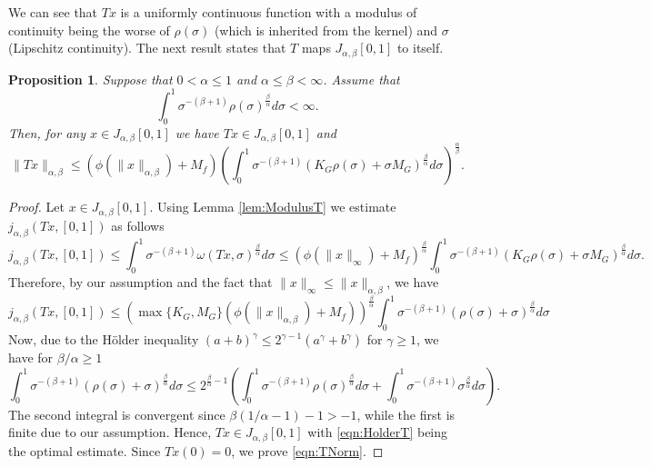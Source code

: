 \documentclass[12pt,a4paper]{article}
\newtheorem{prop}{Proposition}
\begin{document}
We can see that $Tx$ is a uniformly continuous function with a modulus of continuity being the worse of $\rho(\sigma)$ (which is inherited from the kernel) and $\sigma$ (Lipschitz continuity). The next result states that $T$ maps $J_{\alpha,\beta}[0,1]$ to itself.
\begin{prop}\label{prop:TNorm}
	Suppose that $0<\alpha\leq 1$ and $\alpha \leq \beta < \infty$. Assume that
	\begin{equation}\label{eqn:AssumRho}
		\int_0^1 \sigma^{-(\beta+1)} \rho(\sigma)^\frac{\beta}{\alpha} d\sigma < \infty.
	\end{equation}
	Then, for any $x \in J_{\alpha,\beta}[0,1]$ we have $Tx \in J_{\alpha,\beta}[0,1]$ and
	\begin{equation}\label{eqn:TNorm}
		\|Tx\|_{\alpha,\beta} \leq \left(\phi(\|x\|_{\alpha,\beta}) + M_f\right)  \left(\int_0^1 \sigma^{-(\beta+1)} \left(K_G\rho(\sigma) + \sigma M_G \right)^\frac{\beta}{\alpha} d\sigma\right)^\frac{\alpha}{\beta}.
	\end{equation}
\end{prop}
\begin{proof}
	Let $x\in J_{\alpha,\beta}[0,1]$. Using Lemma \ref{lem:ModulusT} we estimate $j_{\alpha,\beta}(Tx, [0,1])$ as follows
	\begin{equation}\label{eqn:HolderT}
		j_{\alpha,\beta}(Tx, [0,1]) \leq \int_0^1 \sigma^{-(\beta+1)} \omega(Tx, \sigma)^\frac{\beta}{\alpha} d\sigma \leq \left(\phi(\|x\|_\infty) + M_f\right)^\frac{\beta}{\alpha} \int_0^1 \sigma^{-(\beta+1)} \left(K_G\rho(\sigma) + \sigma M_G\right)^\frac{\beta}{\alpha} d\sigma. 
	\end{equation}
	Therefore, by our assumption and the fact that $\|x\|_\infty \leq \|x\|_{\alpha,\beta}$, we have
	\begin{equation}
		j_{\alpha,\beta}(Tx, [0,1]) \leq \left(\max\{K_G, M_G\}\left(\phi(\|x\|_{\alpha,\beta}) + M_f\right)\right)^\frac{\beta}{\alpha} \int_0^1 \sigma^{-(\beta+1)} \left(\rho(\sigma) + \sigma\right)^\frac{\beta}{\alpha} d\sigma
	\end{equation}
	Now, due to the H\"older inequality $(a+b)^\gamma \leq 2^{\gamma-1} (a^\gamma + b^\gamma)$ for $\gamma \geq 1$, we have for $\beta/\alpha \geq 1$
	\begin{equation}
		\int_0^1 \sigma^{-(\beta+1)} \left(\rho(\sigma) + \sigma \right)^\frac{\beta}{\alpha} d\sigma \leq 2^{\frac{\beta}{\alpha}-1}\left(\int_0^1 \sigma^{-(\beta+1)} \rho(\sigma)^\frac{\beta}{\alpha} d\sigma + \int_0^1 \sigma^{-(\beta+1)} \sigma^\frac{\beta}{\alpha} d\sigma\right).
	\end{equation}
	The second integral is convergent since $\beta(1/\alpha-1) -1 > -1$, while the first is finite due to our assumption. Hence, $Tx \in J_{\alpha,\beta}[0,1]$ with \eqref{eqn:HolderT} being the optimal estimate. Since $Tx(0) = 0$, we prove \eqref{eqn:TNorm}. 
\end{proof}
\end{document}
